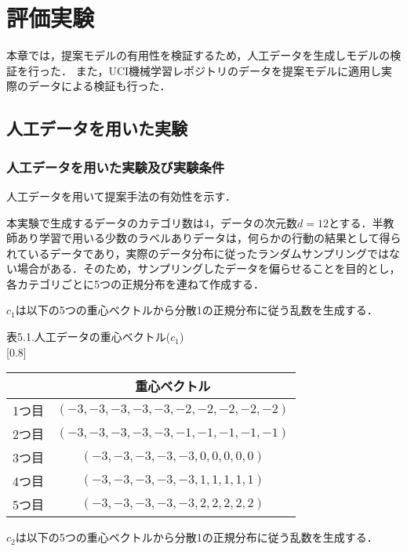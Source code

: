 \chapter{評価実験}

本章では，提案モデルの有用性を検証するため，人工データを生成しモデルの検証を行った．
また，UCI機械学習レポジトリのデータを提案モデルに適用し実際のデータによる検証も行った．
\section{人工データを用いた実験}
\subsection{人工データを用いた実験及び実験条件}
\label{sec:人工データを用いた実験及び実験条件}
人工データを用いて提案手法の有効性を示す．\par

本実験で生成するデータのカテゴリ数は4，データの次元数$d = 12$とする．半教師あり学習で用いる少数のラベルありデータは，何らかの行動の結果として得られているデータであり，実際のデータ分布に従ったランダムサンプリングではない場合がある．そのため，サンプリングしたデータを偏らせることを目的とし，各カテゴリごとに5つの正規分布を連ねて作成する．\par
$c_1$は以下の5つの重心ベクトルから分散1の正規分布に従う乱数を生成する．\par
\begin{center}
表5.1.人工データの重心ベクトル($c_1$)\\
\scalebox{0.75}[0.8]{
\begin{tabular}{|c|c|}
\hline
&重心ベクトル\\
\hline\hline
1つ目&$(-3,-3,-3,-3,-3,-2,-2,-2,-2,-2)$\\
\hline
2つ目&$(-3,-3,-3,-3,-3,-1,-1,-1,-1,-1)$\\
\hline
3つ目&$(-3,-3,-3,-3,-3, 0, 0, 0, 0, 0)$\\
\hline
4つ目&$(-3,-3,-3,-3,-3, 1, 1, 1, 1, 1)$\\
\hline
5つ目&$(-3,-3,-3,-3,-3, 2, 2, 2, 2, 2)$\\
\hline
\end{tabular}
}
\end{center}\par

\newpage
$c_2$は以下の5つの重心ベクトルから分散1の正規分布に従う乱数を生成する．\par

